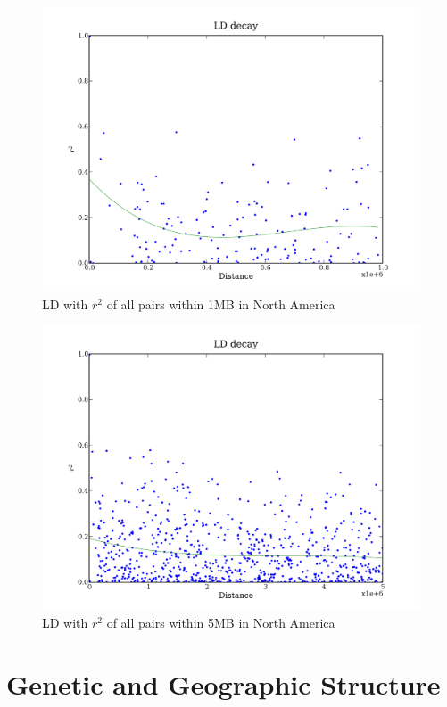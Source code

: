 \documentclass[a4paper,10pt]{article}
\begin{document}
\begin{figure}
\includegraphics[width=1\textwidth]{figures/data_NorAmer_d110_c0_5_LD_r2_1000000.png}
\caption{LD with $r^2$ of all pairs within 1MB in North America}\label{fld_15}
\end{figure}

\begin{figure}
\includegraphics[width=1\textwidth]{figures/data_NorAmer_d110_c0_5_LD_r2_5000000.png}
\caption{LD with $r^2$ of all pairs within 5MB in North America}\label{fld_16}
\end{figure}


\section{Genetic and Geographic Structure}
\end{document}
